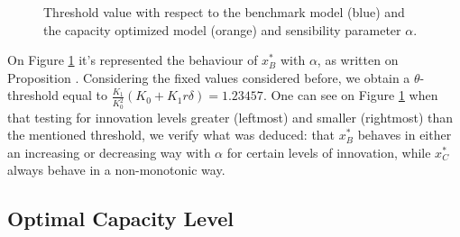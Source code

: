 	\begin{figure}[!htb]
		\begin{subfigmatrix}{2}
		\end{subfigmatrix}
		\caption{Threshold value with respect to the benchmark model (blue) and the capacity optimized model (orange) and sensibility parameter $\alpha$.}
		\label{fig:2_x4}
	\end{figure}
	
	On Figure \ref{fig:2_x4} it's represented the behaviour of $x^*_B$ with $\alpha$, as written on Proposition \label{3_prop2}. Considering the fixed values considered before, we obtain a $\theta$-threshold equal to $\frac{K_1}{ K_0^2} (K_0+K_1 r \delta)=1.23457$. One can see on Figure \ref{fig:2_x4} when that testing for innovation levels greater (leftmost) and smaller (rightmost) than the mentioned threshold, we verify what was deduced: that $x^*_B$ behaves in either an increasing or decreasing way with $\alpha$ for certain levels of innovation, while $x_C^*$ always behave in a non-monotonic way.

\subsection{Optimal Capacity Level}

